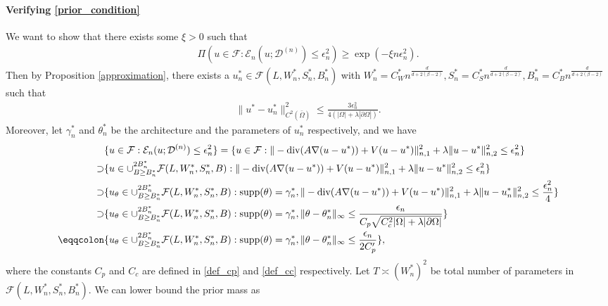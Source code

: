\documentclass{article}
\newcommand{\supp}{\textnormal{supp}}
\newcommand{\F}{\mathcal{F}}
\newcommand{\D}{\mathcal{D}}
\renewcommand{\div}{\textnormal{div}}
\theoremstyle{plain}
\theoremstyle{definition}
\theoremstyle{remark}
\begin{document}
\paragraph{Verifying \ref{prior_condition}} We want to show that there exists some $\xi > 0$ such that
\begin{align*}
         \Pi(u \in \F: \mathcal{E}_n (u; \D^{(n)} ) \leq \epsilon_n^2) \geq \exp(-\xi n \epsilon_n^2).
     \end{align*} 
Then by Proposition \ref{approximation}, there exists a $u_n^* \in \F(L, W_n^*, S_n^*, B_n^*)$ with $W_n^* = C_W^* n^{\frac{d}{d + 2(\beta-2)}}, S_n^* = C_S^* n^{\frac{d}{d + 2(\beta-2)}}, B_n^* = C_B^* n^{\frac{d}{d + 2(\beta-2)}}$ such that 
\begin{align*}
    \|u^* - u_n^*\|_{C^{2}(\bar{\Omega})}^2 \leq \frac{3 \epsilon_n^2}{4 ( |\Omega| + \lambda |\partial \Omega|)}.
\end{align*}
 Moreover, let $\gamma_n^*$ and $\theta_n^*$ be the architecture and the parameters of $u_n^*$ respectively, and we have
\begin{equation*}
    \begin{aligned}
        & \{u \in \F: \mathcal{E}_n(u; \D^{(n)}) \leq \epsilon_n^2 \} = \{u \in \F: \|-\div( A \nabla (u -u^*)) + V(u-u^*)\|_{n, 1}^2 + \lambda \|u-u^*\|_{n, 2}^2 \leq \epsilon_n^2\} \\
         \supset & \{u \in \cup_{B \geq B_{n}^*}^{2 B_n^*} \F(L, W_n^*, S_n^*, B): \|-\div( A \nabla (u -u^*)) + V(u-u^*)\|_{n, 1}^2 + \lambda \|u-u^*\|_{n, 2}^2 \leq \epsilon_n^2 \} \\
         \supset & \{u_\theta \in \cup_{B \geq B_{n}^*}^{2 B_n^*} \F(L, W_n^*, S_n^*, B): \supp(\theta) = \gamma_n^*, \|-\div( A \nabla (u -u^*)) + V(u-u^*)\|_{n, 1}^2 + \lambda \|u-u_n^*\|_{n, 2}^2 \leq \frac{\epsilon_n^2}{4} \} \\
         \supset & \{u_\theta \in \cup_{B \geq B_{n}^*}^{2 B_n^*} \F(L, W_n^*, S_n^*, B): \supp(\theta ) = \gamma_n^*, \|\theta - \theta_n^*\|_\infty \leq \frac{\epsilon_n}{C_p \sqrt{C_c^2 |\Omega| + \lambda |\partial \Omega|}} \}\\
        \eqqcolon &  \{u_\theta \in \cup_{B \geq B_{n}^*}^{2 B_n^*} \F(L, W_n^*, S_n^*, B): \supp(\theta ) = \gamma_n^*, \|\theta - \theta_n^*\|_\infty \leq \frac{\epsilon_n}{2 C_p'} \},
    \end{aligned}
\end{equation*}
where the constants $C_p$ and $C_c$ are defined in \eqref{def_cp} and \eqref{def_cc} respectively. 
Let $T \asymp (W_n^*)^2$ be total number of parameters in $\F(L, W_n^*, S_n^*, B_n^*)$. We can lower bound the prior mass as
\end{document}
